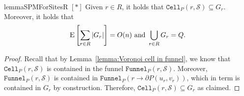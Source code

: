 \documentclass[a4paper,UKenglish]{socg-lipics-v2018}
\newcommand{\s}{\mathcal S}
\newcommand{\funnel}[2][P]{\ensuremath{\mathtt{Funnel}_{\scriptscriptstyle #1}(#2)}}
\newcommand{\cell}[2][P]{\ensuremath{\mathtt{Cell}_{\scriptscriptstyle #1}(#2)}}
\newcommand{\bcell}[2][P]{\ensuremath{\mathtt{bCell}_{\scriptscriptstyle #1}(#2)}}
\newcommand{\ex}[1]{\textsc{E}\left[#1\right]}
\begin{document}
\begin{restatable}{lemma}{SPMForSitesR}\label{lemma:SPMForSitesR}
$[*]$ Given $r\in R$, it holds that $\cell{r, \s}\subseteq G_r$. 
Moreover, it holds that 
\[ \ex{\sum_{r\in R} |G_r|} = O(n)\text{ and }\bigcup_{r\in R} G_r = Q.\]
\end{restatable}

\begin{proof}
Recall that by Lemma~\ref{lemma:Voronoi cell in funnel}, we know that $\cell{r, \s}$ is contained in the funnel $\funnel{r, \s}$.
Moreover, $\funnel{r, \s}$ is contained in $\funnel{r\to  \partial P(u_r, v_r)}$, which in term is contained in $G_r$ by construction.
Therefore, $\cell{r, \s}\subseteq G_r$ as claimed. 




\end{proof}
\end{document}
